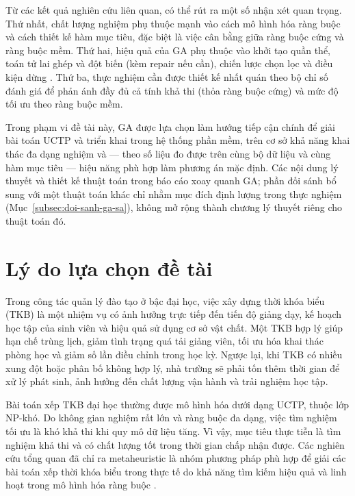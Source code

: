 \documentclass[a4paper,12pt,oneside]{article}
\begin{document}
	Từ các kết quả nghiên cứu liên quan, có thể rút ra một số nhận xét quan trọng. Thứ nhất, chất lượng nghiệm phụ thuộc mạnh vào cách mô hình hóa ràng buộc và cách thiết kế hàm mục tiêu, đặc biệt là việc cân bằng giữa ràng buộc cứng và ràng buộc mềm. Thứ hai, hiệu quả của GA phụ thuộc vào khởi tạo quần thể, toán tử lai ghép và đột biến (kèm repair nếu cần), chiến lược chọn lọc và điều kiện dừng \cite{goldberg1989genetic,burke1997automated}. Thứ ba, thực nghiệm cần được thiết kế nhất quán theo bộ chỉ số đánh giá để phản ánh đầy đủ cả tính khả thi (thỏa ràng buộc cứng) và mức độ tối ưu theo ràng buộc mềm.
	
	Trong phạm vi đề tài này, GA được lựa chọn làm hướng tiếp cận chính để giải bài toán UCTP và triển khai trong hệ thống phần mềm, trên cơ sở khả năng khai thác đa dạng nghiệm và --- theo số liệu đo được trên cùng bộ dữ liệu và cùng hàm mục tiêu --- hiệu năng phù hợp làm phương án mặc định. Các nội dung lý thuyết và thiết kế thuật toán trong báo cáo xoay quanh GA; phần đối sánh bổ sung với một thuật toán khác chỉ nhằm mục đích định lượng trong thực nghiệm (Mục~\ref{subsec:doi-sanh-ga-sa}), không mở rộng thành chương lý thuyết riêng cho thuật toán đó.
	
	\section*{Lý do lựa chọn đề tài}
	
	Trong công tác quản lý đào tạo ở bậc đại học, việc xây dựng thời khóa biểu (TKB) là một nhiệm vụ có ảnh hưởng trực tiếp đến tiến độ giảng dạy, kế hoạch học tập của sinh viên và hiệu quả sử dụng cơ sở vật chất. Một TKB hợp lý giúp hạn chế trùng lịch, giảm tình trạng quá tải giảng viên, tối ưu hóa khai thác phòng học và giảm số lần điều chỉnh trong học kỳ. Ngược lại, khi TKB có nhiều xung đột hoặc phân bố không hợp lý, nhà trường sẽ phải tốn thêm thời gian để xử lý phát sinh, ảnh hưởng đến chất lượng vận hành và trải nghiệm học tập.
	
	Bài toán xếp TKB đại học thường được mô hình hóa dưới dạng UCTP, thuộc lớp NP-khó. Do không gian nghiệm rất lớn và ràng buộc đa dạng, việc tìm nghiệm tối ưu là khó khả thi khi quy mô dữ liệu tăng. Vì vậy, mục tiêu thực tiễn là tìm nghiệm khả thi và có chất lượng tốt trong thời gian chấp nhận được. Các nghiên cứu tổng quan đã chỉ ra metaheuristic là nhóm phương pháp phù hợp để giải các bài toán xếp thời khóa biểu trong thực tế do khả năng tìm kiếm hiệu quả và linh hoạt trong mô hình hóa ràng buộc \cite{schaerf1999survey,lewis2008survey}.
	
\end{document}
